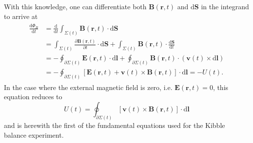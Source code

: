\documentclass{report}
\numberwithin{tm}{section}
\newcommand\vect[1]{\ensuremath{\bm{#1}}}
\begin{document}
	With this knowledge, one can differentiate both $\vect{B}(\vect{r},t)$ and $\mathrm{d}\vect{S}$ in the integrand to arrive at \begin{align}
		\begin{aligned}
			\frac{\mathrm{d}\Phi_B}{\mathrm{d}t} &= \frac{\mathrm{d}}{\mathrm{d}t} \int_{\Sigma(t)}\vect{B}(\vect{r},t)\cdot \mathrm{d}\vect{S} \\
			&= \int_{\Sigma(t)}\frac{\partial \vect{B}(\vect{r},t)}{\partial t}\cdot \mathrm{d}\vect{S} + \int_{\Sigma(t)}\vect{B}(\vect{r},t)\cdot \frac{\mathrm{d}\vect{S}}{\mathrm{d}t} \\
			&= - \oint_{\partial \Sigma(t)} \vect{E}(\vect{r},t)\cdot \mathrm{d}\vect{l} + \oint_{\partial \Sigma(t)}\vect{B}(\vect{r},t)\cdot (\vect{v}(t)\times \mathrm{d}\vect{l}) \\
			&= -\oint_{\partial \Sigma(t)} \left[\vect{E}(\vect{r},t) + \vect{v}(t) \times \vect{B}(\vect{r},t)\right]\cdot \mathrm{d}\vect{l} = -U(t).
		\end{aligned}
	\end{align} In the case where the external magnetic field is zero, i.e. $\vect{E}(\vect{r},t) = 0$, this equation reduces to \begin{equation}\label{eq:watt_bal_fund_eq_1}
	U(t) = \oint_{\partial \Sigma(t)} \left[\vect{v}(t) \times \vect{B}(\vect{r},t)\right]\cdot \mathrm{d}\vect{l}
	\end{equation} and is herewith the first of the fundamental equations used for the Kibble balance experiment. 
	
\end{document}

